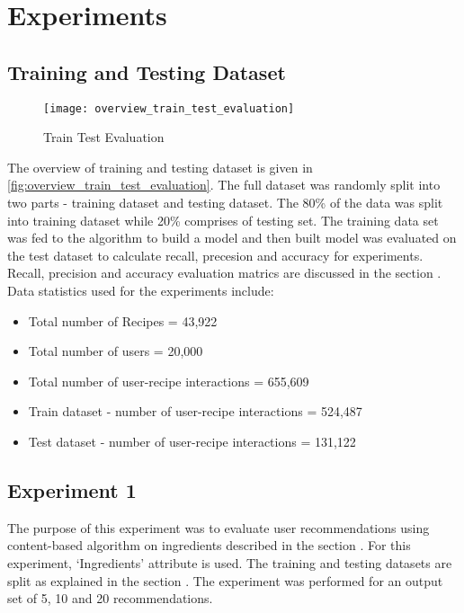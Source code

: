 \section{Experiments}

\subsection{Training and Testing Dataset}
\label{sec:traintest}
\begin{singlespace}
\begin{figure}[H]
	\centering
	\texttt{[image: overview\_train\_test\_evaluation]}
	\caption{Train Test Evaluation }
	\label{fig:overview_train_test_evaluation}
\end{figure}  
\end{singlespace}
The overview of training and testing dataset is given in \autoref{fig:overview_train_test_evaluation}. The full dataset was randomly split into
two parts - training dataset and testing dataset. The 80\% of the data was split into training dataset while 20\% comprises of testing set.  
The training data set was fed to the algorithm to build a model and then built model was evaluated on the test dataset to calculate recall, precesion and accuracy for experiments. Recall, precision and accuracy evaluation matrics are discussed in the section . \\
Data statistics used for the experiments include:
\begin{itemize}
\item Total number of Recipes = 43,922
\item Total number of users = 20,000
\item Total number of user-recipe interactions =  655,609
\item Train dataset - number of user-recipe interactions = 524,487
\item Test dataset - number of user-recipe interactions = 131,122
\end{itemize}



\subsection{Experiment 1}
\label{sec:cb_ingred_exp}
The purpose of this experiment was to evaluate user recommendations using content-based algorithm on ingredients described in the section . For this experiment, \lq{}Ingredients\rq{} attribute is used. The training and testing datasets are split as explained in the section . The experiment was performed for an output set of 5, 10 and 20 recommendations. 

